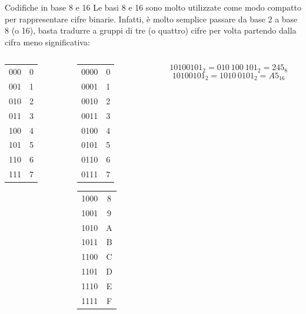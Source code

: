 \documentclass[aspectratio=169]{beamer}
\begin{document}
\begin{frame}{Codifiche in base 8 e 16}
Le basi 8 e 16 sono molto utilizzate come modo compatto per rappresentare cifre binarie.
Infatti, è molto semplice passare da base 2 a base 8 (o 16), basta tradurre a gruppi di tre (o quattro) cifre per volta partendo dalla cifra meno significativa:

\pause
    \vspace{.5cm}
\begin{columns}
    \begin{column}{0.1\textwidth}
        \begin{tabular}{c|c}
            000 & 0 \\
            001 & 1 \\
            010 & 2 \\
            011 & 3 \\
            100 & 4 \\
            101 & 5 \\
            110	& 6	\\
            111 & 7 \\
        \end{tabular}
    \end{column}
    \pause
    \begin{column}{0.3\textwidth}
        \begin{tabular}{c|c}
            0000 & 0 \\
            0001 & 1 \\
            0010 & 2 \\
            0011 & 3 \\
            0100 & 4 \\
            0101 & 5 \\
            0110 & 6 \\
            0111 & 7 \\
        \end{tabular}
        \begin{tabular}{c|c}
            1000 & 8 \\
            1001 & 9 \\
            1010 & A \\
            1011 & B \\
            1100 & C \\
            1101 & D \\
            1110 & E \\
            1111 & F \\
        \end{tabular}
    \end{column}
    \begin{column}{0.5\textwidth}

        \[10100101_2 = 010\ 100\ 101_2 = 245_8 \]
        \[10100101_2 = 1010\ 0101_2 = A5_{16} \]
    \end{column}
\end{columns}
\end{frame}
\end{document}
